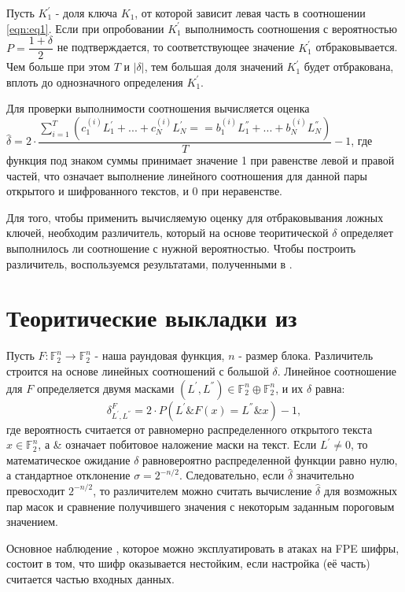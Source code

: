 \documentclass[utf8x, 14pt]{G7-32} %
\begin{document}
Пусть $K_1^{'}$ - доля ключа $K_1$, от которой зависит левая часть в соотношении \ref{eqn:eq1}. Если при опробовании $K_1^{'}$ выполнимость соотношения с вероятностью $P = \dfrac{1+\delta}{2}$ не подтверждается, то соответствующее значение $K_1^{'}$ отбраковывается. Чем больше при этом $T$ и $|\delta|$, тем большая доля значений $K_1^{'}$ будет отбракована, вплоть до однозначного определения $K_1^{'}$.

Для проверки выполнимости соотношения вычисляется оценка $\hat{\delta} = 2\cdot\dfrac{\sum_{i=1}^T \left(c_1^{(i)} L_1^{'} + ... + c_N^{(i)} L_N^{'} == b_1^{(i)} L_1^{''} + ... + b_N^{(i)} L_N^{''}\right)} {T} - 1 $, где функция под знаком суммы принимает значение 1 при равенстве левой и правой частей, что означает выполнение линейного соотношения для данной пары открытого и шифрованного текстов, и 0 при неравенстве.

Для того, чтобы применить вычисляемую оценку для отбраковывания ложных ключей, необходим различитель, который на основе теоритической $\delta$ определяет выполнилось ли соотношение с нужной вероятностью. Чтобы построить различитель, воспользуемся результатами, полученными в \cite{main_paper}.


\section{Теоритические выкладки из \cite{main_paper}}
Пусть $F: \mathbb{F}_2^n \to \mathbb{F}_2^n$ - наша раундовая функция, $n$ - размер блока. Различитель строится на основе линейных соотношений с большой $\delta$. Линейное соотношение для $F$ определяется двумя масками $(L^{'}, L^{''}) \in \mathbb{F}_2^n \oplus \mathbb{F}_2^n$, и их $\delta$ равна:
$$ \delta_{L^{'}, L^{''}}^{F} = 2\cdot P\left(L^{'} \& F(x) = L^{''} \& x\right)-1 ,$$
где вероятность считается от равномерно распределенного открытого текста  $x\in \mathbb{F}_2^n$, а \& означает побитовое наложение маски на текст. Если $L^{'} \neq 0$, то математическое ожидание $\delta$ равновероятно распределенной функции равно нулю, а стандартное отклонение $\sigma = 2^{-n/2}$. Следовательно, если $\hat{\delta}$ значительно превосходит $2^{-n/2}$, то различителем можно считать вычисление $\hat{\delta}$ для возможных пар масок и сравнение получившего значения с некоторым заданным пороговым значением.

Основное наблюдение \cite{main_paper}, которое можно эксплуатировать в атаках на FPE шифры, состоит в том, что шифр оказывается нестойким, если настройка (её часть) считается частью входных данных.
\end{document}
